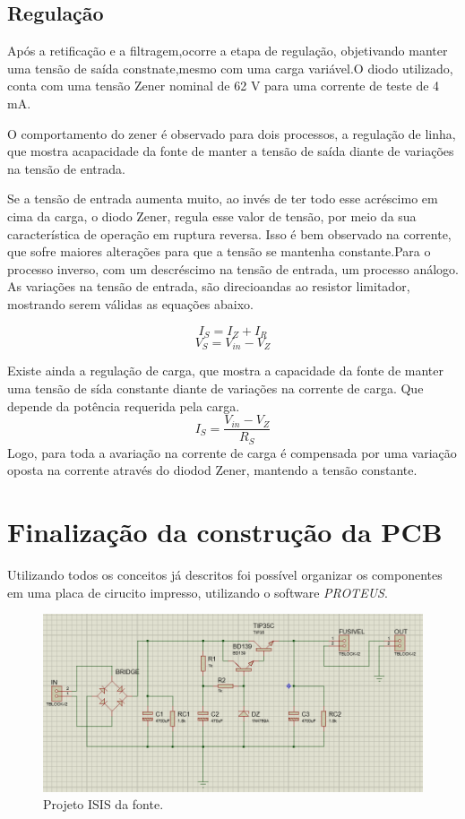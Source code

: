 \documentclass[a4paper,12pt,oneside,openany,table,xcdraw]{article}
\begin{document}
\subsection{Regulação}

Após a retificação e a filtragem,ocorre a etapa de regulação, objetivando manter uma tensão de saída constnate,mesmo com uma carga variável.O diodo utilizado, conta com uma tensão Zener nominal de 62 V para uma corrente de teste de 4 mA.

O comportamento do zener é observado para dois processos, a regulação de linha, que mostra acapacidade da fonte de manter a tensão de saída diante de variações na tensão de entrada.

Se a tensão de entrada aumenta muito, ao invés de ter todo esse acréscimo em cima da carga, o diodo Zener, regula esse valor de tensão, por meio da sua característica de operação em ruptura reversa. Isso é bem observado na corrente, que sofre maiores alterações para que a tensão se mantenha constante.Para o processo inverso, com um descréscimo na tensão de entrada, um processo análogo. As variações na tensão de entrada, são direcioandas ao resistor limitador, mostrando serem válidas as equações abaixo.

\begin{equation}
I_{S}  = I_{Z} +I_{R}  
\end{equation}
\begin{equation}
V_{S}  = V_{in} - V_{Z}
\end{equation}

Existe ainda a  regulação de carga, que mostra a capacidade da fonte de manter uma tensão de sída constante diante de variações na corrente de carga. Que depende da potência requerida pela carga.
\begin{equation}
I_{S}  =\frac{ V_{in} - V_{Z}  }{R_{S}}
\end{equation}
Logo, para toda a avariação na corrente de carga é compensada por uma variação oposta na corrente através do diodod Zener, mantendo a tensão constante.

\section{Finalização da construção da PCB}
Utilizando todos os conceitos já descritos foi possível organizar os componentes em uma placa de cirucito impresso, utilizando o software \emph{PROTEUS}.
\begin{figure}[H]
\centering
\captionsetup{font=scriptsize}
\includegraphics[width=15cm]{isis}
\caption{Projeto ISIS da fonte.}
\label{isis}
\end{figure}
\end{document}
